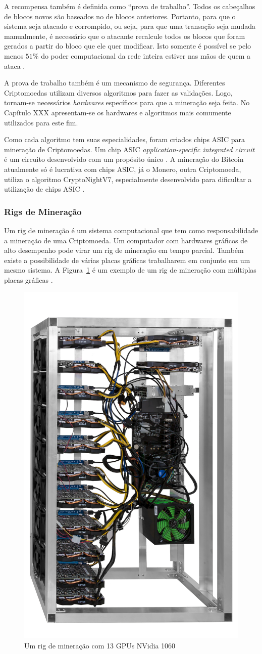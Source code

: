 \documentclass[
article,			%
12pt,				%
openright,			%
oneside,			%
a4paper,			%
chapter=TITLE,		%
section=TITLE,		%
subsection=TITLE,	%
subsubsection=TITLE,%
subsubsubsection=TITLE, %
english,			%
brazil,				%
]{abntex2}
\begin{document}
A recompensa também é definida como ``prova de trabalho''. Todos os
cabeçalhos de blocos novos são baseados no de blocos anteriores.
Portanto, para que o sistema seja atacado e corrompido, ou seja, para
que uma transação seja mudada manualmente, é necessário que o atacante
recalcule todos os blocos que foram gerados a partir do bloco que ele
quer modificar. Isto somente é possível se pelo menos $51\%$ do poder
computacional da rede inteira estiver nas mãos de quem a ataca
\cite{Nakamoto2008, Dev2014}.

A prova de trabalho também é um mecanismo de segurança. Diferentes
Criptomoedas utilizam diversos algoritmos para fazer as validações.
Logo, tornam-se necessários \emph{hardwares} específicos para que a
mineração seja feita. No Capítulo XXX apresentam-se os hardwares e
algoritmos mais comumente utilizados para este fim.

Como cada algoritmo tem suas especialidades, foram criados chips ASIC
para mineração de Criptomoedas. Um chip ASIC
\emph{application-specific integrated circuit} é um circuito
desenvolvido com um propósito único \cite{Smith1997}. A mineração do
Bitcoin atualmente só é lucrativa com chips ASIC\@, já o Monero, outra
Criptomoeda, utiliza o algoritmo CryptoNightV7, especialmente
desenvolvido para dificultar a utilização de chips ASIC\@
\cite{NiceHash2018}.

\subsubsection{Rigs de Mineração}

Um rig de mineração é um sistema computacional que tem como
responsabilidade a mineração de uma Criptomoeda. Um computador com
hardwares gráficos de alto desempenho pode virar um rig de mineração
em tempo parcial. Também existe a possibilidade de várias placas
gráficas trabalharem em conjunto em um mesmo sistema. A
Figura~\ref{fig:rig_mineracao} é um exemplo de um rig de mineração com
múltiplas placas gráficas \cite{BitcoinWiki2015}.

\begin{figure}[!htbp]
    \caption{\label{fig:rig_mineracao}Um rig de mineração com 13 GPUs
    NVidia 1060}
    \begin{center}
        \includegraphics[width=.3\linewidth]{rig_mineracao.png}
    \end{center}
\end{figure}
\end{document}
